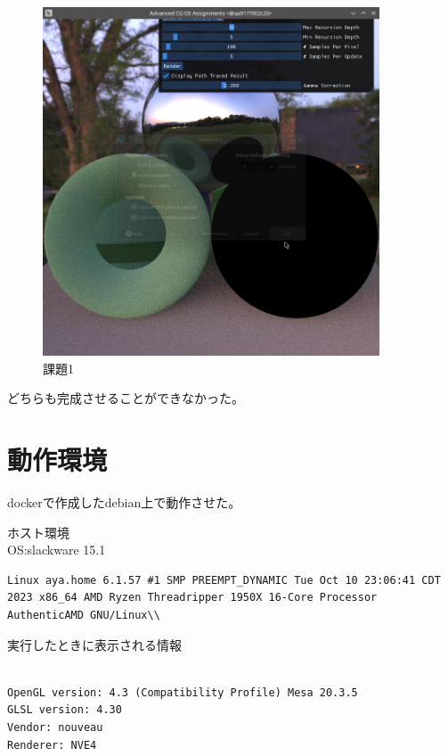 \documentclass[dvipdfmx]{jsarticle}
\begin{document}
\begin{figure}[H]
 \begin{center}
  \includegraphics[width=10cm]{./advancedCG/figures/03kadai1.png}
 \end{center}
 \caption{課題1}
 \label{fig:kadai1}
\end{figure}

どちらも完成させることができなかった。\\

\section*{動作環境}
dockerで作成したdebian上で動作させた。


ホスト環境\\
OS:slackware 15.1\\
\begin{lstlisting}[caption=uname -aの実行結果]
Linux aya.home 6.1.57 #1 SMP PREEMPT_DYNAMIC Tue Oct 10 23:06:41 CDT 2023 x86_64 AMD Ryzen Threadripper 1950X 16-Core Processor AuthenticAMD GNU/Linux\\
\end{lstlisting}
実行したときに表示される情報\\
\begin{lstlisting}[caption=実行時の情報]

OpenGL version: 4.3 (Compatibility Profile) Mesa 20.3.5
GLSL version: 4.30
Vendor: nouveau
Renderer: NVE4

\end{lstlisting}
\end{document}
